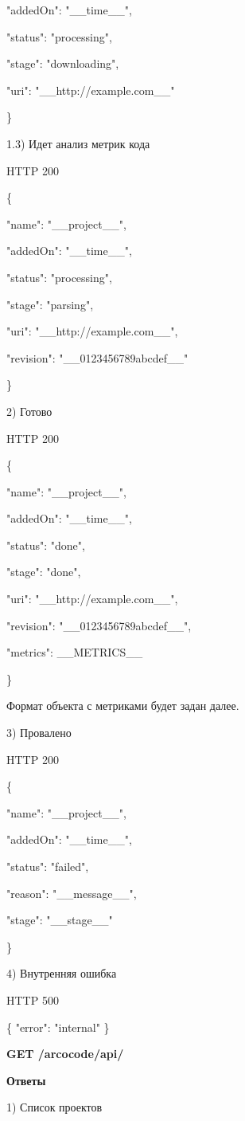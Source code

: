 \documentclass[a4paper,12pt]{article}
\begin{document}
  "addedOn": "\_\_time\_\_",

  "status": "processing",

  "stage": "downloading",

  "uri": "\_\_http://example.com\_\_"

\}

1.3) Идет анализ метрик кода

HTTP 200

\{

  "name": "\_\_project\_\_",

  "addedOn": "\_\_time\_\_",

  "status": "processing",

  "stage": "parsing",

  "uri": "\_\_http://example.com\_\_",

  "revision": "\_\_0123456789abcdef\_\_"

\}

2) Готово

HTTP 200

\{

  "name": "\_\_project\_\_",

  "addedOn": "\_\_time\_\_",

  "status": "done",

  "stage": "done",

  "uri": "\_\_http://example.com\_\_",

  "revision": "\_\_0123456789abcdef\_\_",

  "metrics": \_\_METRICS\_\_

\}

Формат объекта с метриками будет задан далее.

3) Провалено

HTTP 200

\{

  "name": "\_\_project\_\_",

  "addedOn": "\_\_time\_\_",

  "status": "failed",

  "reason": "\_\_message\_\_",

  "stage": "\_\_stage\_\_"

\}

4) Внутренняя ошибка

HTTP 500

\{ "error": "internal" \}

\newpage
\textbf{GET /arcocode/api/}

\textbf{Ответы}

1) Список проектов
\end{document}
